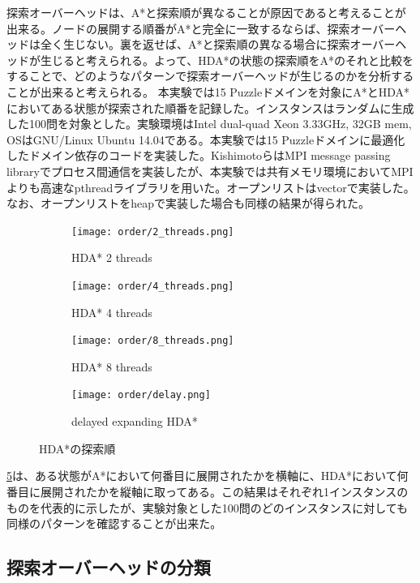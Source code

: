 \documentclass{jsarticle}
\begin{document}
探索オーバーヘッドは、A*と探索順が異なることが原因であると考えることが出来る。ノードの展開する順番がA*と完全に一致するならば、探索オーバーヘッドは全く生じない。裏を返せば、A*と探索順の異なる場合に探索オーバーヘッドが生じると考えられる。よって、HDA*の状態の探索順をA*のそれと比較をすることで、どのようなパターンで探索オーバーヘッドが生じるのかを分析することが出来ると考えられる。
本実験では15 Puzzleドメインを対象にA*とHDA*においてある状態が探索された順番を記録した。インスタンスはランダムに生成した100問を対象とした。実験環境はIntel dual-quad Xeon 3.33GHz, 32GB mem, OSはGNU/Linux Ubuntu 14.04である。本実験では15 Puzzleドメインに最適化したドメイン依存のコードを実装した。KishimotoらはMPI message passing libraryでプロセス間通信を実装したが、本実験では共有メモリ環境においてMPIよりも高速なpthreadライブラリを用いた。オープンリストはvectorで実装した。なお、オープンリストをheapで実装した場合も同様の結果が得られた。


\begin{figure}
	\begin{subfigure}{0.6\columnwidth}
		\centering
		\texttt{[image: order/2\_threads.png]}
		\label{fig:order:2_threads}
		\caption{HDA* 2 threads}
	\end{subfigure}
	\begin{subfigure}{0.6\columnwidth}
		\centering
		\texttt{[image: order/4\_threads.png]}
		\label{fig:order:4_threads}
		\caption{HDA* 4 threads}
	\end{subfigure}
	\begin{subfigure}{0.6\columnwidth}
		\centering
		\texttt{[image: order/8\_threads.png]}
		\label{fig:order:8_t8hreads}
		\caption{HDA* 8 threads}
	\end{subfigure}
	\begin{subfigure}{0.6\columnwidth}
		\centering
		\texttt{[image: order/delay.png]}
		\label{fig:order:delay}
		\caption{delayed expanding HDA*}
	\end{subfigure}
	\label{fig:hdastar_orders}
	\caption{HDA*の探索順}
\end{figure}%


\ref{fig:hdastar_orders}は、ある状態がA*において何番目に展開されたかを横軸に、HDA*において何番目に展開されたかを縦軸に取ってある。この結果はそれぞれ1インスタンスのものを代表的に示したが、実験対象とした100問のどのインスタンスに対しても同様のパターンを確認することが出来た。

\subsection{探索オーバーヘッドの分類}
\end{document}
